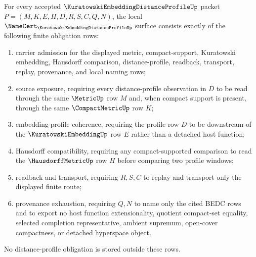 \begin{theorem}
\label{thm:kuratowski-embedding-distance-profile-namecert-obligations}
For every accepted $\KuratowskiEmbeddingDistanceProfileUp$ packet $P=(M,K,E,H,D,R,S,C,Q,N)$, the local $\NameCert_{\KuratowskiEmbeddingDistanceProfileUp}$ surface consists exactly of the following finite obligation rows:
\begin{enumerate}
\item carrier admission for the displayed metric, compact-support, Kuratowski embedding, Hausdorff comparison, distance-profile, readback, transport, replay, provenance, and local naming rows;
\item source exposure, requiring every distance-profile observation in $D$ to be read through the same $\MetricUp$ row $M$ and, when compact support is present, through the same $\CompactMetricUp$ row $K$;
\item embedding-profile coherence, requiring the profile row $D$ to be downstream of the $\KuratowskiEmbeddingUp$ row $E$ rather than a detached host function;
\item Hausdorff compatibility, requiring any compact-supported comparison to read the $\HausdorffMetricUp$ row $H$ before comparing two profile windows;
\item readback and transport, requiring $R,S,C$ to replay and transport only the displayed finite route;
\item provenance exhaustion, requiring $Q,N$ to name only the cited BEDC rows and to export no host function extensionality, quotient compact-set equality, selected completion representative, ambient supremum, open-cover compactness, or detached hyperspace object.
\end{enumerate}
No distance-profile obligation is stored outside these rows.
\end{theorem}
